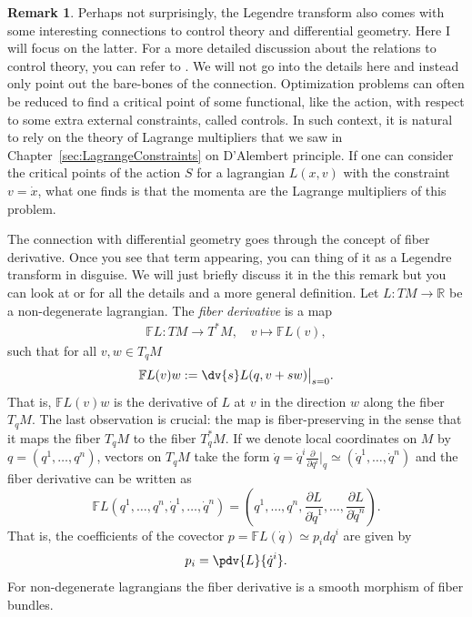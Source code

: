 \documentclass[english,fontsize=11pt,paper=b5]{scrbook}
\numberwithin{equation}{chapter}
\theoremstyle{definition}
\newtheorem{remark}{Remark}[chapter]
\begin{document}
    \begin{remark}
      Perhaps not surprisingly, the Legendre transform also comes with some interesting connections to control theory and differential geometry.
      Here I will focus on the latter. For a more detailed discussion about the relations to control theory, you can refer to \cite[Appendix II]{book:gelfand}.
      We will not go into the details here and instead only point out the bare-bones of the connection.
      Optimization problems can often be reduced to find a critical point of some functional, like the action, with respect to some extra external constraints, called controls.
      In such context, it is natural to rely on the theory of Lagrange multipliers that we saw in Chapter~\ref{sec:LagrangeConstraints} on D'Alembert principle.
      If one can consider the critical points of the action $S$ for a lagrangian $L(x,v)$ with the constraint $v=\dot x$, what one finds is that the momenta are the Lagrange multipliers of this problem.

      The connection with differential geometry goes through the concept of fiber derivative. Once you see that term appearing, you can thing of it as a Legendre transform in disguise. We will just briefly discuss it in the this remark but you can look at \cite[Chapter 7.2]{book:marsdenratiu} or \cite[Chapter 3.5]{book:amr} for all the details and a more general definition.
      Let $L:TM \to \mathbb{R}$ be a non-degenerate lagrangian. The \emph{fiber derivative} is a map
      \begin{align}
        \mathbb{F}L : TM \to T^*M, \quad v \mapsto \mathbb{F}L(v),
      \end{align}
      such that for all $v,w \in T_q M$
      \begin{align}
        \mathbb{F}L(v) w := \dv{s} L(q, v + s w) \big|_{s=0}.
      \end{align}
      That is, $\mathbb{F}L(v) w$ is the derivative of $L$ at $v$ in the direction $w$ along the fiber $T_qM$.
      The last observation is crucial: the map is fiber-preserving in the sense that it maps the fiber $T_qM$ to the fiber $T^*_qM$.
      If we denote local coordinates on $M$ by $q=(q^1, \ldots, q^n)$, vectors on $T_qM$ take the form $\dot q = \dot q^i \frac{\partial}{\partial q^i}\big|_q \simeq (\dot q^1, \ldots, \dot q^n)$ and the fiber derivative can be written as
      \begin{equation}
        \mathbb{F}L(q^1, \ldots, q^n, \dot q^1, \ldots,\dot q^n) = \left(q^1, \ldots, q^n, \frac{\partial L}{\partial \dot q^1}, \ldots, \frac{\partial L}{\partial \dot q^n}\right).
      \end{equation}
      That is, the coefficients of the covector $p = \mathbb{F}L(\dot q) \simeq p_i dq^i$ are given by
      \begin{equation}
        p_i = \pdv{L}{\dot q^i}.
      \end{equation}
      For non-degenerate lagrangians the fiber derivative is a smooth morphism of fiber bundles.


\end{remark}
\end{document}

